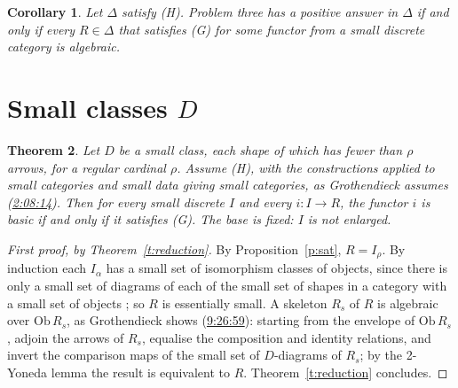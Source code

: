 \documentclass[11pt,a4paper]{amsart}
\newtheorem{theorem}{Theorem}[section]
\newtheorem{corollary}[theorem]{Corollary}
\theoremstyle{definition}
\theoremstyle{remark}
\newcommand{\ts}[3]{\href{https://www.youtube.com/watch?v=#1&t=#2}{#3}}
\begin{document}
\begin{corollary}\label{c:reduction}
Let $\Delta$ satisfy (H). Problem three has a positive answer in $\Delta$ if and only if every $R\in\Delta$ that satisfies (G) for some functor from a small discrete category is algebraic.
\end{corollary}

\section{Small classes $D$}\label{sec:small}

\begin{theorem}\label{t:small}
Let $D$ be a small class, each shape of which has fewer than $\rho$ arrows, for a regular cardinal $\rho$. Assume (H), with the constructions applied to small categories and small data giving small categories, as Grothendieck assumes (\ts{4gynb9uTEE4}{2h8m14s}{2:08:14}). Then for every small discrete $I$ and every $i\colon I\to R$, the functor $i$ is basic if and only if it satisfies (G). The base is fixed: $I$ is not enlarged.
\end{theorem}

\begin{proof}[First proof, by Theorem~\ref{t:reduction}]
By Proposition~\ref{p:sat}, $R=I_\rho$. By induction each $I_\alpha$ has a small set of isomorphism classes of objects, since there is only a small set of diagrams of each of the small set of shapes in a category with a small set of objects \cite[\S3.5]{kellybook}; so $R$ is essentially small. A skeleton $R_s$ of $R$ is algebraic over $\mathrm{Ob}\,R_s$, as Grothendieck shows (\ts{PqCQM3Pcl6Q}{9h26m59s}{9:26:59}): starting from the envelope of $\mathrm{Ob}\,R_s$, adjoin the arrows of $R_s$, equalise the composition and identity relations, and invert the comparison maps of the small set of $D$-diagrams of $R_s$; by the 2-Yoneda lemma the result is equivalent to $R$. Theorem~\ref{t:reduction} concludes.
\end{proof}
\end{document}
